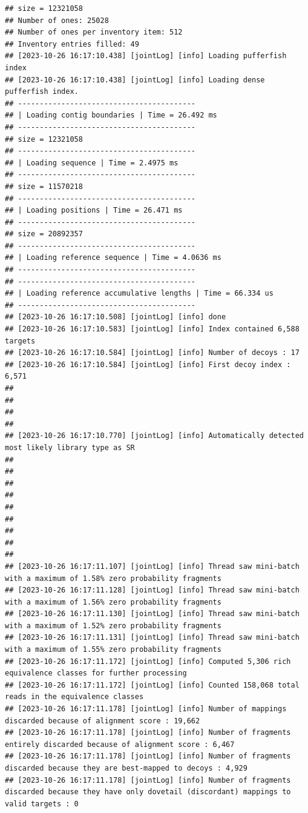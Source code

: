 \documentclass[
]{book}
\begin{document}
\begin{verbatim}
## size = 12321058
## Number of ones: 25028
## Number of ones per inventory item: 512
## Inventory entries filled: 49
## [2023-10-26 16:17:10.438] [jointLog] [info] Loading pufferfish index
## [2023-10-26 16:17:10.438] [jointLog] [info] Loading dense pufferfish index.
## -----------------------------------------
## | Loading contig boundaries | Time = 26.492 ms
## -----------------------------------------
## size = 12321058
## -----------------------------------------
## | Loading sequence | Time = 2.4975 ms
## -----------------------------------------
## size = 11570218
## -----------------------------------------
## | Loading positions | Time = 26.471 ms
## -----------------------------------------
## size = 20892357
## -----------------------------------------
## | Loading reference sequence | Time = 4.0636 ms
## -----------------------------------------
## -----------------------------------------
## | Loading reference accumulative lengths | Time = 66.334 us
## -----------------------------------------
## [2023-10-26 16:17:10.508] [jointLog] [info] done
## [2023-10-26 16:17:10.583] [jointLog] [info] Index contained 6,588 targets
## [2023-10-26 16:17:10.584] [jointLog] [info] Number of decoys : 17
## [2023-10-26 16:17:10.584] [jointLog] [info] First decoy index : 6,571 
## 
## 
## 
## 
## [2023-10-26 16:17:10.770] [jointLog] [info] Automatically detected most likely library type as SR
## 
## 
## 
## 
## 
## 
## 
## 
## 
## [2023-10-26 16:17:11.107] [jointLog] [info] Thread saw mini-batch with a maximum of 1.58% zero probability fragments
## [2023-10-26 16:17:11.128] [jointLog] [info] Thread saw mini-batch with a maximum of 1.56% zero probability fragments
## [2023-10-26 16:17:11.130] [jointLog] [info] Thread saw mini-batch with a maximum of 1.52% zero probability fragments
## [2023-10-26 16:17:11.131] [jointLog] [info] Thread saw mini-batch with a maximum of 1.55% zero probability fragments
## [2023-10-26 16:17:11.172] [jointLog] [info] Computed 5,306 rich equivalence classes for further processing
## [2023-10-26 16:17:11.172] [jointLog] [info] Counted 158,068 total reads in the equivalence classes 
## [2023-10-26 16:17:11.178] [jointLog] [info] Number of mappings discarded because of alignment score : 19,662
## [2023-10-26 16:17:11.178] [jointLog] [info] Number of fragments entirely discarded because of alignment score : 6,467
## [2023-10-26 16:17:11.178] [jointLog] [info] Number of fragments discarded because they are best-mapped to decoys : 4,929
## [2023-10-26 16:17:11.178] [jointLog] [info] Number of fragments discarded because they have only dovetail (discordant) mappings to valid targets : 0

\end{verbatim}
\end{document}
